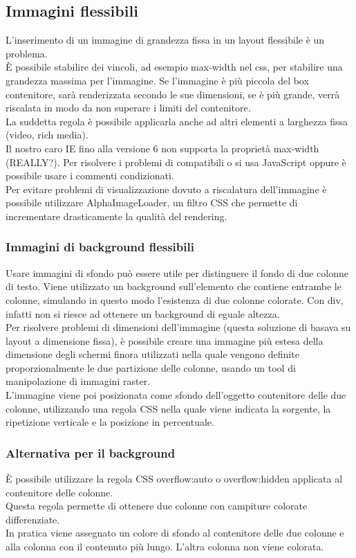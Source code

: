 \documentclass{article}
\begin{document}
\subsection{Immagini flessibili}
L'inserimento di un immagine di grandezza fissa in un layout flessibile è un problema.\\
È possibile stabilire dei vincoli, ad esempio max-width nel css, per stabilire una grandezza massima per l'immagine. Se l'immagine è più piccola del box contenitore, sarà renderizzata secondo le sue dimensioni, se è più grande, verrà riscalata in modo da non superare i limiti del contenitore.\\
La suddetta regola è possibile applicarla anche ad altri elementi a larghezza fissa (video, rich media).\\
Il nostro caro IE fino alla versione 6 non supporta la proprietà max-width (REALLY?). Per risolvere i problemi di compatibili o si usa JavaScript oppure è possibile usare i commenti condizionati. \\
Per evitare problemi di visualizzazione dovuto a riscalatura dell'immagine è possibile utilizzare AlphaImageLoader, un filtro CSS che permette di incrementare drasticamente la qualità del rendering.
\subsubsection{Immagini di background flessibili}
Usare immagini di sfondo può essere utile per distinguere il fondo di due colonne di testo. Viene utilizzato un background sull'elemento che contiene entrambe le colonne, simulando in questo modo l'esistenza di due colonne colorate. Con div, infatti non si riesce ad ottenere un background di eguale altezza.\\
Per risolvere problemi di dimensioni dell'immagine (questa soluzione di basava su layout a dimensione fissa), è possibile creare una immagine più estesa della dimensione degli schermi finora utilizzati nella quale vengono definite proporzionalmente le due partizione delle colonne, usando un tool di manipolazione di immagini raster.\\
L'immagine viene poi posizionata come sfondo dell'oggetto contenitore delle due colonne, utilizzando una regola CSS nella quale viene indicata la sorgente, la ripetizione verticale e la posizione in percentuale.
\subsubsection{Alternativa per il background}
È possibile utilizzare la regola CSS overflow:auto o overflow:hidden applicata al contenitore delle colonne.\\
Questa regola permette di ottenere due colonne con campiture colorate differenziate.\\
In pratica viene assegnato un colore di sfondo al contenitore delle due colonne e alla colonna con il contenuto più lungo. L'altra colonna non viene colorata.\\
\end{document}
